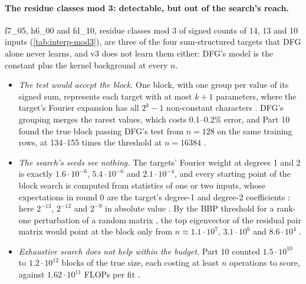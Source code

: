\paragraph{The residue classes mod 3: detectable, but out of the search's reach.} f7\_05, h6\_00 and fd\_10, residue classes mod 3 of signed counts of 14, 13 and 10 inputs (\cref{tab:interp-mod3}), are three of the four sum-structured targets that DFG alone never learns, and v3 does not learn them either: DFG's model is the constant plus the kernel background at every $n$.
\begin{itemize}
\item \emph{The test would accept the block.} One block, with one group per value of its signed sum, represents each target with at most $k+1$ parameters, where the target's Fourier expansion has all $2^k-1$ non-constant characters . DFG's grouping merges the rarest values, which costs 0.1--0.2\% error, and Part 10 found the true block passing DFG's test from $n=128$ on the same training rows, at 134--155 times the threshold at $n=16384$ .
\item \emph{The search's seeds see nothing.} The targets' Fourier weight at degrees 1 and 2 is exactly $1.6\cdot10^{-6}$, $5.4\cdot10^{-6}$ and $2.1\cdot10^{-4}$, and every starting point of the block search is computed from statistics of one or two inputs, whose expectations in round 0 are the target's degree-1 and degree-2 coefficients : here $2^{-13}$, $2^{-12}$ and $2^{-9}$ in absolute value . By the BBP threshold for a rank-one perturbation of a random matrix \cite{baik2005phase,benaychgeorges2011eigenvalues}, the top eigenvector of the residual pair matrix would point at the block only from $n\approx1.1\cdot10^7$, $3.1\cdot10^6$ and $8.6\cdot10^4$ .
\item \emph{Exhaustive search does not help within the budget.} Part 10 counted $1.5\cdot10^{10}$ to $1.2\cdot10^{12}$ blocks of the true size, each costing at least $n$ operations to score, against $1.62\cdot10^{11}$ FLOPs per fit \cite{portfoliolearner2026} .
\end{itemize}
